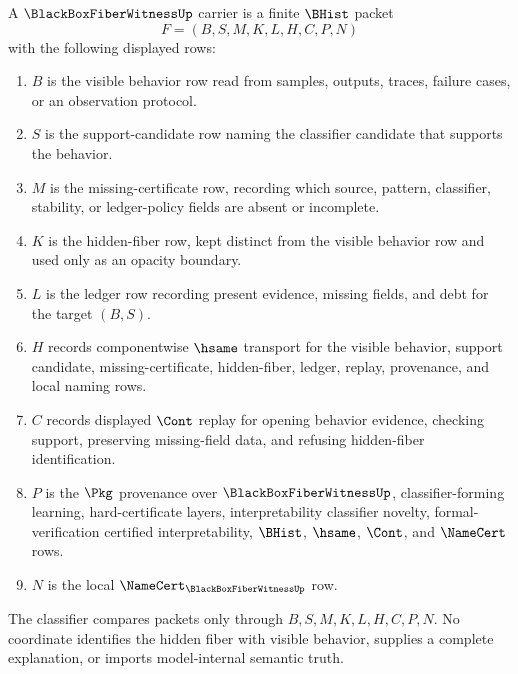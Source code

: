 \begin{definition}
\label{def:black-box-fiber-witness-carrier}
A $\BlackBoxFiberWitnessUp$ carrier is a finite $\BHist$ packet
$$
F=(B,S,M,K,L,H,C,P,N)
$$
with the following displayed rows:
\begin{enumerate}
\item $B$ is the visible behavior row read from samples, outputs, traces, failure cases, or an observation protocol.
\item $S$ is the support-candidate row naming the classifier candidate that supports the behavior.
\item $M$ is the missing-certificate row, recording which source, pattern, classifier, stability, or ledger-policy fields are absent or incomplete.
\item $K$ is the hidden-fiber row, kept distinct from the visible behavior row and used only as an opacity boundary.
\item $L$ is the ledger row recording present evidence, missing fields, and debt for the target $(B,S)$.
\item $H$ records componentwise $\hsame$ transport for the visible behavior, support candidate, missing-certificate, hidden-fiber, ledger, replay, provenance, and local naming rows.
\item $C$ records displayed $\Cont$ replay for opening behavior evidence, checking support, preserving missing-field data, and refusing hidden-fiber identification.
\item $P$ is the $\Pkg$ provenance over $\BlackBoxFiberWitnessUp$, classifier-forming learning, hard-certificate layers, interpretability classifier novelty, formal-verification certified interpretability, $\BHist$, $\hsame$, $\Cont$, and $\NameCert$ rows.
\item $N$ is the local $\NameCert_{\BlackBoxFiberWitnessUp}$ row.
\end{enumerate}
The classifier compares packets only through $B,S,M,K,L,H,C,P,N$. No coordinate identifies the hidden fiber with visible behavior, supplies a complete explanation, or imports model-internal semantic truth.
\end{definition}

